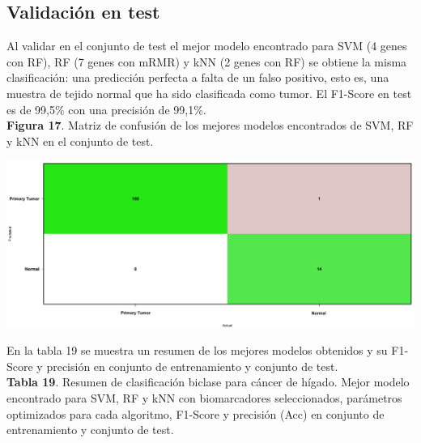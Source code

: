 \newpage

\subsection{Validación en test}

Al validar en el conjunto de test el mejor modelo encontrado para SVM (4 genes con RF), RF (7 genes con mRMR) y kNN (2 genes con RF) se obtiene la misma clasificación: una predicción perfecta a falta de un falso positivo, esto es, una muestra de tejido normal que ha sido clasificada como tumor. El F1-Score en test es de 99,5\% con una precisión de 99,1\%.\\

\textbf{Figura 17}. Matriz de confusión de los mejores modelos encontrados de SVM, RF y kNN en el conjunto de test.

\begin{center}
	\includegraphics[width=1\textwidth]{figuras/17_higado_biclase_18_svm_matriz_confusion_mejor_metodo.png} 
\end{center}

En la tabla 19 se muestra un resumen de los mejores modelos obtenidos y su F1-Score y precisión en conjunto de entrenamiento y conjunto de test.\\

\textbf{Tabla 19}. Resumen de clasificación biclase para cáncer de hígado. Mejor modelo encontrado para SVM, RF y kNN con biomarcadores seleccionados, parámetros optimizados para cada algoritmo, F1-Score y precisión (Acc) en conjunto de entrenamiento y conjunto de test.

